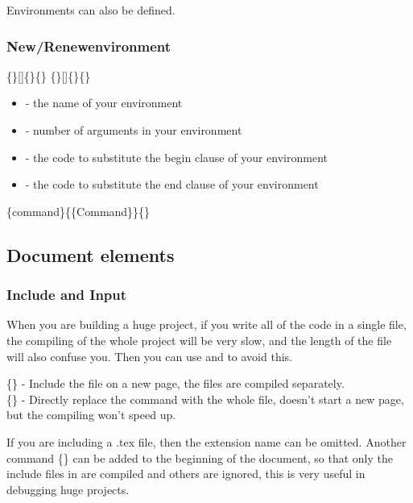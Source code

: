 \begin{frame}
	Environments can also be defined.
	\frametitle{New/Renewenvironment}
	\begin{command}
		\{\}[]\{\}\{\}
		\{\}[]\{\}\{\}
		\begin{itemize}
			\item {} - the name of your environment
			\item {} - number of arguments in your environment
			\item {} - the code to substitute the begin clause of your environment
			\item {} - the code to substitute the end clause of your environment
		\end{itemize}
	\end{command}
	\begin{example}
		\{command\}\{\{Command\}\}\{\sampleend{block}\}
	\end{example}
\end{frame}

\subsection{Document elements}

\begin{frame}
	\frametitle{Include and Input}
	When you are building a huge project, if you write all of the code in a single file, the compiling of the whole project will be very slow, and the length of the file will also confuse you. Then you can use  and  to avoid this.
	\begin{command}
		\{\} - Include the file on a new page, the files are compiled separately.\\
		\{\} - Directly replace the command with the whole file, doesn't start a new page, but the compiling won't speed up.	
	\end{command} 
	If you are including a .tex file, then the extension name can be omitted. Another command \{\} can be added to the beginning of the document, so that only the include files in  are compiled and others are ignored, this is very useful in debugging huge projects.
\end{frame}

